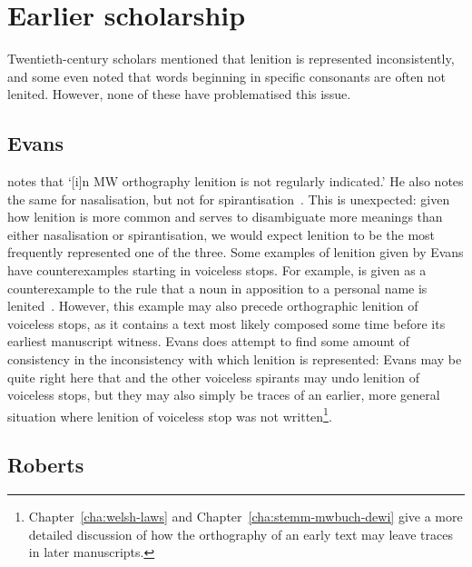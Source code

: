 \section{Earlier scholarship}
\label{sec:earlier-literature}
Twentieth-century scholars mentioned that lenition is represented inconsistently, and some even noted that words beginning in specific consonants are often not lenited. However, none of these have problematised this issue.

\subsection{Evans}
\label{sec:evans}

\Textcite[§~18]{evans_grammar_1964} notes that `[i]n MW orthography lenition is not regularly indicated.' He also notes the same for nasalisation, but not for spirantisation~\autocite[§§~24--25]{evans_grammar_1964}. This is unexpected: given how lenition is  more common and serves to disambiguate more meanings than either nasalisation or spirantisation, we would expect lenition to be the most frequently represented one of the three. Some examples of lenition given by Evans have counterexamples starting in voiceless stops. For example,  is given as a counterexample to the rule that a noun in apposition to a personal name is lenited~\autocite[§~19]{evans_grammar_1964}. However, this example may also precede orthographic lenition of voiceless stops, as it contains a text most likely composed some time before its earliest manuscript witness. Evans does attempt to find some amount of consistency in the inconsistency with which lenition is represented:
Evans may be quite right here that  and the other voiceless spirants may undo lenition of voiceless stops, but they may also simply be traces of an earlier, more general situation where lenition of voiceless stop was not written\footnote{Chapter~\ref{cha:welsh-laws} and Chapter~\ref{cha:stemm-mwbuch-dewi} give a more detailed discussion of how the orthography of an early text may leave traces in later manuscripts.}.

\subsection{Roberts}
\label{sec:roberts}

